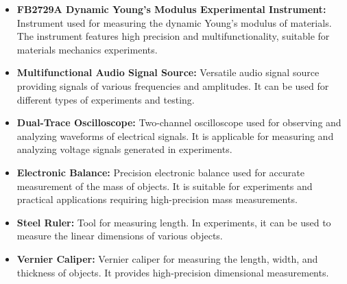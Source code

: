 \documentclass[UTF8]{article}
\begin{document}
	\begin{itemize}
	    \item \textbf{FB2729A Dynamic Young's Modulus Experimental Instrument:} Instrument used for measuring the dynamic Young's modulus of materials. The instrument features high precision and multifunctionality, suitable for materials mechanics experiments.
	
	    \item \textbf{Multifunctional Audio Signal Source:} Versatile audio signal source providing signals of various frequencies and amplitudes. It can be used for different types of experiments and testing.
	
	    \item \textbf{Dual-Trace Oscilloscope:} Two-channel oscilloscope used for observing and analyzing waveforms of electrical signals. It is applicable for measuring and analyzing voltage signals generated in experiments.
	
	    \item \textbf{Electronic Balance:} Precision electronic balance used for accurate measurement of the mass of objects. It is suitable for experiments and practical applications requiring high-precision mass measurements.
	
	    \item \textbf{Steel Ruler:} Tool for measuring length. In experiments, it can be used to measure the linear dimensions of various objects.
	
	    \item \textbf{Vernier Caliper:} Vernier caliper for measuring the length, width, and thickness of objects. It provides high-precision dimensional measurements.
	
	\end{itemize}
    
\end{document}
